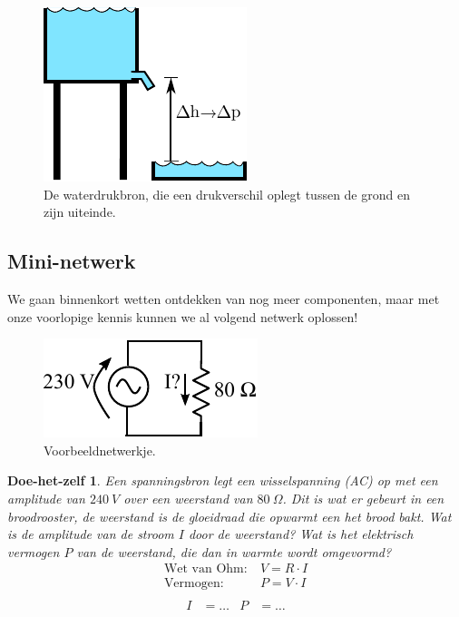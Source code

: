 \documentclass{article}
\newtheorem{DIY}{Doe-het-zelf}
\begin{document}
		\begin{figure}[htbp]
				\centering
				\includegraphics{waterbron}
				\caption{De waterdrukbron, die een drukverschil oplegt tussen de grond en zijn uiteinde.}
				\label{fig:waterbron}
			\end{figure}
		\subsection{Mini-netwerk}
			We gaan binnenkort wetten ontdekken van nog meer componenten, maar met onze voorlopige kennis kunnen we al volgend netwerk oplossen!

			\begin{figure}[h!]
				\centering
				\includegraphics{vbweerstand.pdf}
				\caption{Voorbeeldnetwerkje.}
				\label{fig:vbweerstand}
			\end{figure}

			\begin{DIY} 
			Een spanningsbron legt een wisselspanning (AC) op met een amplitude van $240~V$ over een weerstand van $80~\Omega$. Dit is wat er gebeurt in een broodrooster, de weerstand is de gloeidraad die opwarmt een het brood bakt. Wat is de amplitude van de  stroom $I$ door de weerstand? Wat is het elektrisch vermogen $P$ van de weerstand, die dan in warmte wordt omgevormd?
			\begin{align*}
				\text{Wet van Ohm:}~&V = R\cdot I \\
				\text{Vermogen:}~&P = V\cdot I \\
			\end{align*}
			\begin{align}
			    I&= \ldots & P&= \ldots 
			\end{align}
			\end{DIY}
\end{document}
